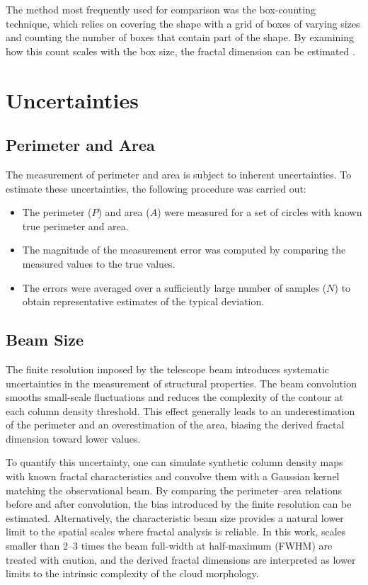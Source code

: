 The method most frequently used for comparison was the box-counting technique, which relies on covering the shape with a grid of boxes of varying sizes and counting the number of boxes that contain part of the shape. By examining how this count scales with the box size, the fractal dimension can be estimated \cite{falconer2013fractal}. 

\section{Uncertainties}

\subsection{Perimeter and Area}

The measurement of perimeter and area is subject to inherent uncertainties. To estimate these uncertainties, the following procedure was carried out:

\begin{itemize}
    \item The perimeter ($P$) and area ($A$) were measured for a set of circles with known true perimeter and area.
    \item The magnitude of the measurement error was computed by comparing the measured values to the true values.
    \item The errors were averaged over a sufficiently large number of samples ($N$) to obtain representative estimates of the typical deviation.
\end{itemize}

\subsection{Beam Size}

The finite resolution imposed by the telescope beam introduces systematic uncertainties in the measurement of structural properties. The beam convolution smooths small-scale fluctuations and reduces the complexity of the contour at each column density threshold. This effect generally leads to an underestimation of the perimeter and an overestimation of the area, biasing the derived fractal dimension toward lower values.

To quantify this uncertainty, one can simulate synthetic column density maps with known fractal characteristics and convolve them with a Gaussian kernel matching the observational beam. By comparing the perimeter–area relations before and after convolution, the bias introduced by the finite resolution can be estimated. Alternatively, the characteristic beam size provides a natural lower limit to the spatial scales where fractal analysis is reliable. In this work, scales smaller than 2–3 times the beam full-width at half-maximum (FWHM) are treated with caution, and the derived fractal dimensions are interpreted as lower limits to the intrinsic complexity of the cloud morphology.

